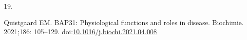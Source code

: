 \documentclass[
  12pt,
  a4paper,
]{book}
\newlength{\cslhangindent}
\newlength{\csllabelwidth}
\newlength{\cslentryspacingunit} %
\newenvironment{CSLReferences}[2] %
 {%
  \setlength{\parindent}{0pt}
  \ifodd #1
  \let\oldpar\par
  \def\par{\hangindent=\cslhangindent\oldpar}
  \fi
  \setlength{\parskip}{#2\cslentryspacingunit}
 }%
 {}
\newcommand{\CSLLeftMargin}[1]{\parbox[t]{\csllabelwidth}{#1}}
\newcommand{\CSLRightInline}[1]{\parbox[t]{\linewidth - \csllabelwidth}{#1}\break}
\begin{document}
\begin{CSLReferences}{0}{0}
\leavevmode{}%
\CSLLeftMargin{19. }%
\CSLRightInline{Quistgaard EM. {BAP31}: {Physiological} functions and roles in disease. Biochimie. 2021;186: 105--129. doi:\href{https://doi.org/10.1016/j.biochi.2021.04.008}{10.1016/j.biochi.2021.04.008}}

\end{CSLReferences}
\end{document}
